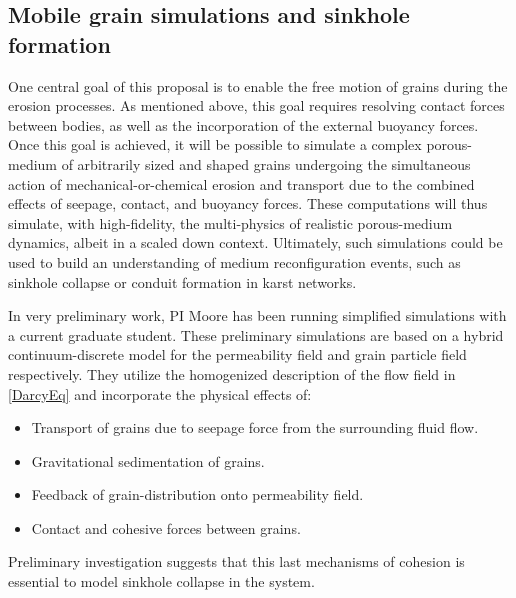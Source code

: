 \documentclass[11pt]{article}
\begin{document}

\subsection{Mobile grain simulations and sinkhole formation}


One central goal of this proposal is to enable the free motion of grains during the erosion processes. As mentioned above, this goal requires resolving contact forces between bodies, as well as the incorporation of the external buoyancy forces. Once this goal is achieved, it will be possible to simulate a complex porous-medium of arbitrarily sized and shaped grains undergoing the simultaneous action of mechanical-or-chemical erosion and transport due to the combined effects of seepage, contact, and buoyancy forces. These computations will thus simulate, with high-fidelity, the multi-physics of realistic porous-medium dynamics, albeit in a scaled down context. Ultimately, such simulations could be used to build an understanding of medium reconfiguration events, such as sinkhole collapse or conduit formation in karst networks.

	In very preliminary work, PI Moore has been running simplified simulations with a current graduate student. These preliminary simulations are based on a hybrid continuum-discrete model for the permeability field and grain particle field respectively. They utilize the homogenized description of the flow field in \eqref{DarcyEq} and incorporate the physical effects of:
\begin{itemize}[noitemsep]
\item Transport of grains due to seepage force from the surrounding fluid flow.
\item Gravitational sedimentation of grains.
\item Feedback of grain-distribution onto permeability field.
\item Contact and cohesive forces between grains.
\end{itemize}
Preliminary investigation suggests that this last mechanisms of cohesion is essential to model sinkhole collapse in the system.
\end{document}
